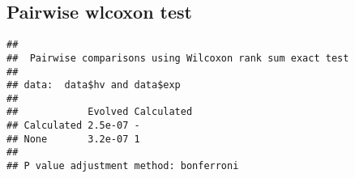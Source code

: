 \documentclass[
]{book}
\newenvironment{Shaded}{\begin{snugshade}}{\end{snugshade}}
\newcommand{\AttributeTok}[1]{\textcolor[rgb]{0.13,0.29,0.53}{#1}}
\newcommand{\ConstantTok}[1]{\textcolor[rgb]{0.56,0.35,0.01}{#1}}
\newcommand{\FunctionTok}[1]{\textcolor[rgb]{0.13,0.29,0.53}{\textbf{#1}}}
\newcommand{\NormalTok}[1]{#1}
\newcommand{\SpecialCharTok}[1]{\textcolor[rgb]{0.81,0.36,0.00}{\textbf{#1}}}
\newcommand{\StringTok}[1]{\textcolor[rgb]{0.31,0.60,0.02}{#1}}
\begin{document}
\hypertarget{pairwise-wlcoxon-test-11}{%
\subsection{Pairwise wlcoxon test}\label{pairwise-wlcoxon-test-11}}

\begin{Shaded}
\end{Shaded}

\begin{verbatim}
## 
##  Pairwise comparisons using Wilcoxon rank sum exact test 
## 
## data:  data$hv and data$exp 
## 
##            Evolved Calculated
## Calculated 2.5e-07 -         
## None       3.2e-07 1         
## 
## P value adjustment method: bonferroni
\end{verbatim}

  
\end{document}
